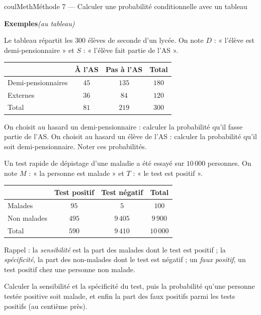 \documentclass[11pt,a4paper]{article}
\makeatletter
\newcounter{lycee@signet}
\newcommand{\signet}[3][]{\stepcounter{lycee@signet}%
  \edef\lycee@dest{\if\relax\detokenize{#1}\relax
    signet.\arabic{lycee@signet}\else#1\fi}%
  \hypertarget{\lycee@dest}{}\bookmark[level=#2,dest=\lycee@dest]{#3}}
\newcounter{methode}
\newenvironment{methodebox}[1][Méthode]{\stepcounter{methode}%
  \begin{boitecours}[phantom={\signet[methode-\arabic{methode}]{2}{#1}}]{coulMeth}{#1}}%
  {\end{boitecours}}
\newcommand{\autableau}{\hfill{\footnotesize\itshape\color{black!45}(au tableau)}}
\newcommand{\etapeexemples}{%
    \par\smallskip\textbf{\color{coulMeth}Exemples}\autableau\par\nobreak\smallskip}
\makeatother
\begin{document}
\begin{methodebox}[Méthode 7 --- Calculer une probabilité conditionnelle avec un tableau]
\etapeexemples
\begin{questions}[label=\alph*)]
  \item Le tableau répartit les $300$ élèves de seconde d'un lycée. On note $D$ :
    « l'élève est demi-pensionnaire » et $S$ : « l'élève fait partie de l'AS ».
    \begin{center}
    \renewcommand{\arraystretch}{1.5}
    \begin{tabular}{|l|c|c|c|}
    \hline
     & À l'AS & Pas à l'AS & Total \\
    \hline
    Demi-pensionnaires & $45$ & $135$ & $180$ \\
    \hline
    Externes & $36$ & $84$ & $120$ \\
    \hline
    Total & $81$ & $219$ & $300$ \\
    \hline
    \end{tabular}
    \end{center}
    On choisit au hasard un demi-pensionnaire : calculer la probabilité qu'il fasse
    partie de l'AS. On choisit au hasard un élève de l'AS : calculer la probabilité
    qu'il soit demi-pensionnaire. Noter ces probabilités.
  \item Un test rapide de dépistage d'une maladie a été essayé sur $10\,000$
    personnes. On note $M$ : « la personne est malade » et $T$ : « le test est
    positif ».
    \begin{center}
    \renewcommand{\arraystretch}{1.5}
    \begin{tabular}{|l|c|c|c|}
    \hline
     & Test positif & Test négatif & Total \\
    \hline
    Malades & $95$ & $5$ & $100$ \\
    \hline
    Non malades & $495$ & $9\,405$ & $9\,900$ \\
    \hline
    Total & $590$ & $9\,410$ & $10\,000$ \\
    \hline
    \end{tabular}
    \end{center}
    Rappel : la \emph{sensibilité} est la part des malades dont le test est positif ;
    la \emph{spécificité}, la part des non-malades dont le test est négatif ; un
    \emph{faux positif}, un test positif chez une personne non malade.

    Calculer la sensibilité et la spécificité du test, puis la probabilité qu'une
    personne testée positive soit malade, et enfin la part des faux positifs parmi
    les tests positifs (au centième près).
\end{questions}


\end{methodebox}
\end{document}

